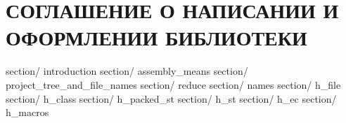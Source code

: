 \part{СОГЛАШЕНИЕ О НАПИСАНИИ И ОФОРМЛЕНИИ БИБЛИОТЕКИ}\label{logic:bib2}
	{section/}	{introduction}					%
	{section/}	{assembly_means}				%
	{section/}	{project_tree_and_file_names}	%
	{section/}	{reduce}						%
	{section/}	{names}							%
	{section/}	{h_file}						%
	{section/}	{h_class}						%
	{section/}	{h_packed_st}					%
	{section/}	{h_st}							%
	{section/}	{h_ec}							%
	{section/}	{h_macros}						%